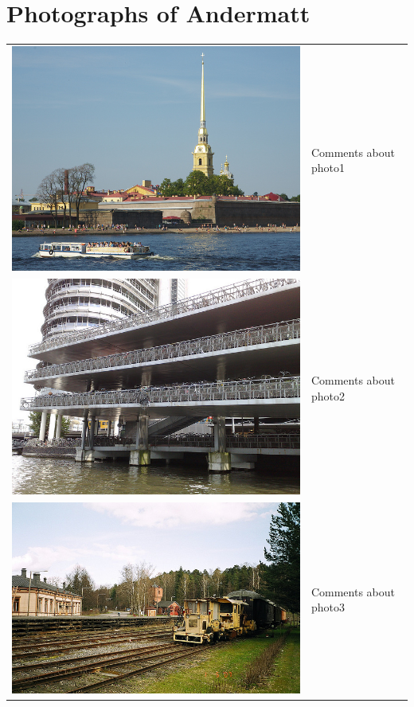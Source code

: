 \documentclass[a4paper]{article}
\newcommand{\mycity}{Andermatt\xspace}
\begin{document}
\section{Photographs of \mycity}
\begin{tabular}{lp{}}
\includegraphics[keepaspectratio,width=.5\textwidth]{photo1} & Comments about photo1\\[.2cm]
\includegraphics[keepaspectratio,width=.5\textwidth]{photo2} & Comments about photo2\\[.2cm]
\includegraphics[keepaspectratio,width=.5\textwidth]{photo3} & Comments about photo3\\
\end{tabular}
\end{document}
